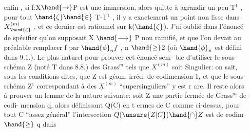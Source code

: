  enfin , si f:X$\hand{\rightarrow}$P est une immersion, alors
quitte à agrandir un peu T$^{1}$ , pour tout $\hand{\zeta}\hand{\in}$ T-T$^{1}$ , il y a exactement un
point non lisse dans $X^{(m)}_{\hand{\zeta}}$ , et ce dernier est rationnel sur k($\hand{\zeta}$). J'ai
oublié dans l'énoncé de spécifier qu'on supposait X  $\hand{\longrightarrow}$ P non ramifié,
et que l'on devait au préalable remplacer f par $\hand{\phi}_{n}f$ , n $\hand{\geq}$2 (où $\hand{\phi}_{n}$ est
défini dans 9.1.). Le plus naturel  pour prouver cet énoncé sem-%
ble d'utiliser le sous-schéma Z (noté T dans 8.8.) des Grass$^{m}$ tels
que $\underline{X}^{(m)}$ soit Singulier: on sait, sous les conditions dites, que Z
est géom. irréd. de codimension 1, et que le sous-schéma Z$^{1}$ correspondant
à des $\underline{X}^{(m)}$ ``supersinguliers'' y est r are. Il reste alors à prouver un
lemme de la nature suivante: soit Z une partie fermée de Grass$^{m}$ de codi-%
mension q, alors définissant Q(C) en t ermes de C comme ci-dessus, pour
tout C ``assez général'' l'intersection $Q(\unsure{Z|C})\hand{\cap} Z$ est de codim $\hand{\geq}$ q dans

